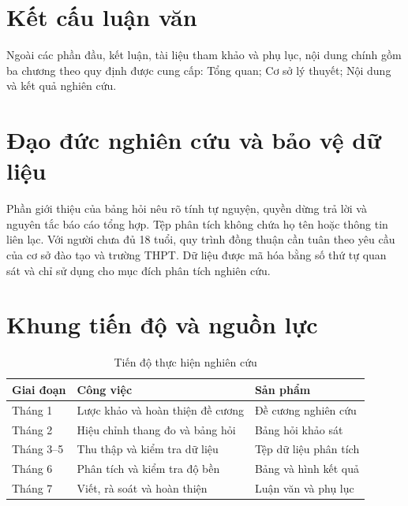 \section{Kết cấu luận văn}
Ngoài các phần đầu, kết luận, tài liệu tham khảo và phụ lục, nội dung chính gồm ba chương theo quy định được cung cấp: Tổng quan; Cơ sở lý thuyết; Nội dung và kết quả nghiên cứu.

\section{Đạo đức nghiên cứu và bảo vệ dữ liệu}
Phần giới thiệu của bảng hỏi nêu rõ tính tự nguyện, quyền dừng trả lời và nguyên tắc báo cáo tổng hợp. Tệp phân tích không chứa họ tên hoặc thông tin liên lạc. Với người chưa đủ 18 tuổi, quy trình đồng thuận cần tuân theo yêu cầu của cơ sở đào tạo và trường THPT. Dữ liệu được mã hóa bằng số thứ tự quan sát và chỉ sử dụng cho mục đích phân tích nghiên cứu.

\section{Khung tiến độ và nguồn lực}
\begin{table}[H]\centering\caption{Tiến độ thực hiện nghiên cứu}\begin{tabularx}{\textwidth}{p{3cm}Xp{3cm}}\toprule Giai đoạn & Công việc & Sản phẩm\\\midrule Tháng 1 & Lược khảo và hoàn thiện đề cương & Đề cương nghiên cứu\\Tháng 2 & Hiệu chỉnh thang đo và bảng hỏi & Bảng hỏi khảo sát\\Tháng 3--5 & Thu thập và kiểm tra dữ liệu & Tệp dữ liệu phân tích\\Tháng 6 & Phân tích và kiểm tra độ bền & Bảng và hình kết quả\\Tháng 7 & Viết, rà soát và hoàn thiện & Luận văn và phụ lục\\\bottomrule\end{tabularx}\end{table}
